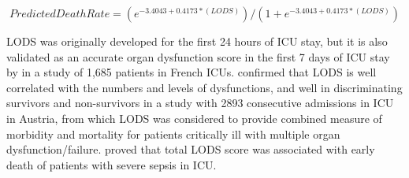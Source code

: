 \documentclass[12pt,a4paper,english
]{tunithesis}
\begin{document}
\begin{equation}
Predicted Death Rate = (e^{-3.4043 + 0.4173*(LODS)} ) / ( 1 +  e^{-3.4043 + 0.4173*(LODS)} )
\end{equation}

LODS was originally developed for the first 24 hours of ICU stay, but it is also validated as an accurate organ dysfunction score in the first 7 days of ICU stay by \textcite{Timsit2002} in a study of 1,685 patients in French ICUs. \textcite{Metnitz2001} confirmed that LODS is well correlated with the numbers and levels of dysfunctions, and well in discriminating survivors and non-survivors in a study with 2893 consecutive admissions in ICU in Austria, from which LODS was considered to provide combined measure of morbidity and mortality for patients critically ill with multiple organ dysfunction/failure. \textcite{Blanco2008}  proved that total LODS score was associated with early death of patients with severe sepsis in ICU.
\end{document}

